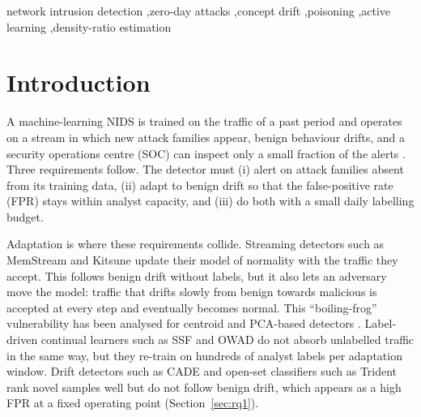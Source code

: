 \documentclass[a4paper,fleqn]{cas-dc}
\begin{document}
\begin{keywords}
network intrusion detection \sep zero-day attacks \sep concept drift \sep poisoning
\sep active learning \sep density-ratio estimation
\end{keywords}

\maketitle

\pagestyle{fancy}
\fancyhf{}
\fancyfoot[C]{\footnotesize\thepage}
\renewcommand{\headrulewidth}{0pt}
\renewcommand{\footrulewidth}{0pt}
\fancypagestyle{plain}{\fancyhf{}\renewcommand{\headrulewidth}{0pt}%
  \renewcommand{\footrulewidth}{0pt}}
\thispagestyle{empty}

\section{Introduction}
\label{sec:intro}
A machine-learning NIDS is trained on the traffic of a past period and operates on a stream in which new attack families appear, benign behaviour drifts, and a security operations centre (SOC) can inspect only a small fraction of the alerts \cite{sommer2010outside,arp2022dos}. Three requirements follow. The detector must (i) alert on attack families absent from its training data, (ii) adapt to benign drift so that the false-positive rate (FPR) stays within analyst capacity, and (iii) do both with a small daily labelling budget.

Adaptation is where these requirements collide. Streaming detectors such as MemStream \cite{bhatia2022memstream} and Kitsune \cite{mirsky2018kitsune} update their model of normality with the traffic they accept. This follows benign drift without labels, but it also lets an adversary move the model: traffic that drifts slowly from benign towards malicious is accepted at every step and eventually becomes normal. This ``boiling-frog'' vulnerability has been analysed for centroid and PCA-based detectors \cite{kloft2012security,rubinstein2009antidote}. Label-driven continual learners such as SSF \cite{zhang2025ssf} and OWAD \cite{han2023owad} do not absorb unlabelled traffic in the same way, but they re-train on hundreds of analyst labels per adaptation window. Drift detectors such as CADE \cite{yang2021cade} and open-set classifiers such as Trident \cite{zhao2024trident} rank novel samples well but do not follow benign drift, which appears as a high FPR at a fixed operating point (Section~\ref{sec:rq1}).
\end{document}
